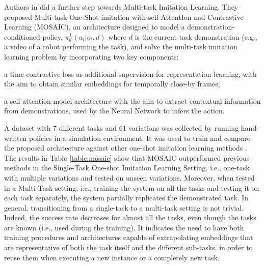 Authors in \cite{mandi2022towards_more_generalizable_one_shot} did a further step towards Multi-task Imitation Learning. They proposed Multi-task One-Shot imitation with self-AttentIon and Contrastive Learning (MOSAIC), an architecture designed to model a demonstration-conditioned policy, $\pi^{L}_{\theta}(a_{t}|o_{t},d)$ where $d$ is the current task demonstration (e.g., a video of a robot performing the task), and solve the multi-task imitation learning problem by incorporating two key components: \begin{enumerate*}[label=\textbf{(\arabic*)}]
    \item a time-contrastive loss as additional supervision for representation learning, with the aim to obtain similar embeddings for temporally close-by frames;
    \item a self-attention model architecture with the aim to extract contextual information from demonstrations, used by the Neural Network to infers the action.
\end{enumerate*} A dataset with 7 different tasks and 61 variations was collected by running hand-written policies in a simulation environment. It was used to train and compare the proposed architecture against other one-shot imitation learning methods \cite{yu2018daml,dasari2021transformers_one_shot}. The results in Table \ref{table:mosaic} show that MOSAIC outperformed previous methods in the Single-Task One-shot Imitation Learning Setting, i.e., one-task with multiple variations and tested on unseen variations. Moreover, when tested in a Multi-Task setting, i.e., training the system on all the tasks and testing it on each task separately, the system partially replicates the demonstrated task. In general, transitioning from a single-task to a multi-task setting is not trivial. Indeed, the success rate decreases for almost all the tasks, even though the tasks are known (i.e., used during the training). It indicates the need to have both training procedures and architectures capable of extrapolating embeddings that are representative of both the task itself and the different sub-tasks, in order to reuse them when executing a new instance or a completely new task.
